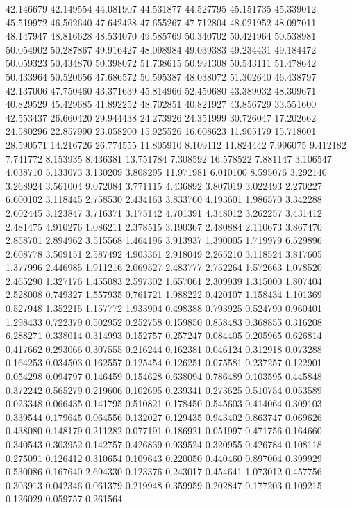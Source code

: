 42.146679
42.149554
44.081907
44.531877
44.527795
45.151735
45.339012
45.519972
46.562640
47.642428
47.655267
47.712804
48.021952
48.097011
48.147947
48.816628
48.534070
49.585769
50.340702
50.421964
50.538981
50.054902
50.287867
49.916427
48.098984
49.039383
49.234431
49.184472
50.059323
50.434870
50.398072
51.738615
50.991308
50.543111
51.478642
50.433964
50.520656
47.686572
50.595387
48.038072
51.302640
46.438797
42.137006
47.750460
43.371639
45.814966
52.450680
43.389032
48.309671
40.829529
45.429685
41.892252
48.702851
40.821927
43.856729
33.551600
42.553437
26.660420
29.944438
24.273926
24.351999
30.726047
17.202662
24.580296
22.857990
23.058200
15.925526
16.608623
11.905179
15.718601
28.590571
14.216726
26.774555
11.805910
8.109112
11.824442
7.996075
9.412182
7.741772
8.153935
8.436381
13.751784
7.308592
16.578522
7.881147
3.106547
4.038710
5.133073
3.130209
3.808295
11.971981
6.010100
8.595076
3.292140
3.268924
3.561004
9.072084
3.771115
4.436892
3.807019
3.022493
2.270227
6.600102
3.118445
2.758530
2.434163
3.833760
4.193601
1.986570
3.342288
2.602445
3.123847
3.716371
3.175142
4.701391
4.348012
3.262257
3.431412
2.481475
4.910276
1.086211
2.378515
3.190367
2.480884
2.110673
3.867470
2.858701
2.894962
3.515568
1.464196
3.913937
1.390005
1.719979
6.529896
2.608778
3.509151
2.587492
4.903361
2.918049
2.265210
3.118524
3.817605
1.377996
2.446985
1.911216
2.069527
2.483777
2.752264
1.572663
1.078520
2.465290
1.327176
1.455083
2.597302
1.657061
2.309939
1.315000
1.807404
2.528008
0.749327
1.557935
0.761721
1.988222
0.420107
1.158434
1.101369
0.527948
1.352215
1.157772
1.933904
0.498388
0.793925
0.524790
0.960401
1.298433
0.722379
0.502952
0.252758
0.159850
0.858483
0.368855
0.316208
6.288271
0.338014
0.314993
0.152757
0.257247
0.084405
0.205965
0.626814
0.417662
0.293066
0.307555
0.216244
0.162381
0.046124
0.312918
0.073288
0.164253
0.034503
0.162557
0.125454
0.126251
0.075581
0.237257
0.122901
0.054298
0.094797
0.146459
0.154628
0.638094
0.786489
0.103595
0.445848
0.372242
0.565279
0.219606
0.102695
0.239341
0.273625
0.510754
0.053589
0.023348
0.066435
0.141795
0.510821
0.178450
0.545603
0.414064
0.309103
0.339544
0.179645
0.064556
0.132027
0.129435
0.943402
0.863747
0.069626
0.438080
0.148179
0.211282
0.077191
0.186921
0.051997
0.471756
0.164660
0.340543
0.303952
0.142757
0.426839
0.939524
0.320955
0.426784
0.108118
0.275091
0.126412
0.310654
0.109643
0.220050
0.440460
0.897004
0.399929
0.530086
0.167640
2.694330
0.123376
0.243017
0.454641
1.073012
0.457756
0.303913
0.042346
0.061379
0.219948
0.359959
0.202847
0.177203
0.109215
0.126029
0.059757
0.261564
